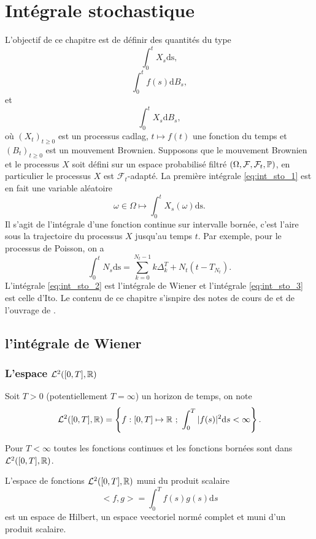 \chapter{Intégrale stochastique}\label{chap:sto_calc}
L'objectif de ce chapitre est de définir des quantités du type
\begin{equation}\label{eq:int_sto_1}
\int_0^tX_s\text{ds},
\end{equation}
\begin{equation}\label{eq:int_sto_2}
\int_0^tf(s)\text{d}B_s,
\end{equation}
et 
\begin{equation}\label{eq:int_sto_3}
\int_0^tX_s\text{d}B_s,
\end{equation}
où $(X_t)_{t\geq 0}$ est un processus cadlag, $t\mapsto f(t)$ une fonction du temps et $(B_t)_{t\geq 0}$ est un mouvement Brownien. Supposons que le mouvement Brownien et le processus $X$ soit défini sur un espace probabilisé filtré $(\Omega,\mathcal{F}, \mathcal{F}_t, \mathbb{P})$, en particulier le processus $X$ est $\mathcal{F}_t$-adapté. La première intégrale \eqref{eq:int_sto_1} est en fait une variable aléatoire 
$$
\omega\in\Omega\mapsto\int_0^tX_s(\omega)\text{ds}.
$$
Il s'agit de l'intégrale d'une fonction continue sur intervalle bornée, c'est l'aire sous la trajectoire du processus $X$ jusqu'au temps $t$. Par exemple, pour le processus de Poisson, on a 
$$
\int_0^t N_s \text{ds} = \sum_{k=0}^{N_t-1} k\Delta^T_k + N_t(t - T_{N_t}).
$$
L'intégrale \eqref{eq:int_sto_2} est l'intégrale de Wiener et l'intégrale \eqref{eq:int_sto_3} est celle d'Ito. Le contenu de ce chapitre s'isnpire des notes de cours de \citet{MJB06} et de l'ouvrage de \citet{Dobrow2016}.
\section{l'intégrale de Wiener}\label{sec:wiener_integral}
\subsection{L'espace $\mathcal{L}^2([0,T],\mathbb{R})$}\label{ssec:espace_L2}
Soit $T>0$ (potentiellement $T=\infty$) un horizon de temps, on note 
$$
\mathcal{L}^2([0,T],\mathbb{R}) = \left\{f:[0,T]\mapsto \mathbb{R} \text{ ; }\int_0^T|f(s)|^2\text{d}s <\infty\right\}.
$$
\begin{remark}
Pour $T<\infty$ toutes les fonctions continues et les fonctions bornées sont dans $\mathcal{L}^2([0,T],\mathbb{R})$. 
\end{remark}
L'espace de fonctions $\mathcal{L}^2([0,T],\mathbb{R})$ muni du produit scalaire 
$$
<f,g> = \int_0^Tf(s)g(s)\text{d}s
$$
est un espace de Hilbert, un espace veectoriel normé complet et muni d'un produit scalaire. 

